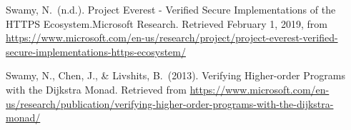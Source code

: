 \documentclass[12pt,twoside]{article}
\begin{document}
{\begin{thebibliography}{222}
\mdbibitemlabel{[Swamy, n.d.]}Swamy, N.~(n.d.). Project Everest - Verified Secure Implementations of the HTTPS Ecosystem.Microsoft Research. Retrieved February 1, 2019, from \href{https://www.microsoft.com/en-us/research/project/project-everest-verified-secure-implementations-https-ecosystem/}{{\ttfamily https://\hspace{0pt}www.\hspace{0pt}microsoft.\hspace{0pt}com/\hspace{0pt}en-\hspace{0pt}us/\hspace{0pt}research/\hspace{0pt}project/\hspace{0pt}project-\hspace{0pt}everest-\hspace{0pt}verified-\hspace{0pt}secure-\hspace{0pt}implementations-\hspace{0pt}https-\hspace{0pt}ecosystem/\hspace{0pt}}}\label{swamy_project_nodate}%

Swamy, N., Chen, J., \& Livshits, B.~(2013). Verifying Higher-order Programs with the Dijkstra Monad. Retrieved from \href{https://www.microsoft.com/en-us/research/publication/verifying-higher-order-programs-with-the-dijkstra-monad/}{{\ttfamily https://\hspace{0pt}www.\hspace{0pt}microsoft.\hspace{0pt}com/\hspace{0pt}en-\hspace{0pt}us/\hspace{0pt}research/\hspace{0pt}publication/\hspace{0pt}verifying-\hspace{0pt}higher-\hspace{0pt}order-\hspace{0pt}programs-\hspace{0pt}with-\hspace{0pt}the-\hspace{0pt}dijkstra-\hspace{0pt}monad/\hspace{0pt}}}\label{swamy_verifying_2013}%


\end{thebibliography}}
\end{document}
